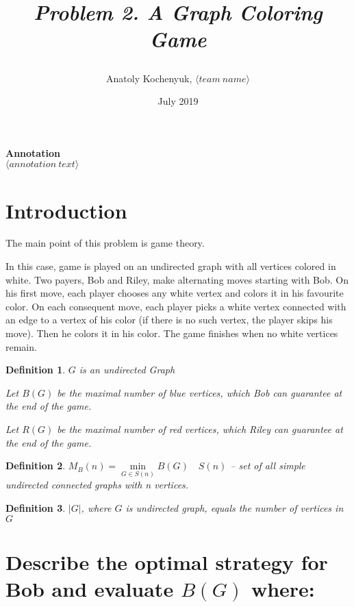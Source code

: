 \documentclass[12pt,a4paper, flushleft]{article}
\author{Anatoly Kochenyuk, $\langle team~name\rangle$}
\date{July 2019}
\title{
	\vspace{4cm}	
	\horline{440}	
	\begin{center}
		\begin{Huge}
			\textbf{\emph{Problem 2. A Graph Coloring Game}}
		\end{Huge}
	\end{center}	
	\vspace{-1.3cm}	
	\horline{460}
}
\newtheorem{Def}{Definition}[section]
\newcommand{\lr}[1]{\langle #1 \rangle}
\begin{document}
\maketitle
\vspace{4cm}
	
	\begin{myquote}
	\begin{center}
		\textbf{Annotation}\\
		\textit{
			$\lr{annotation~text}$
		}
	\end{center}
	\end{myquote}	
	
	\pagebreak

	\tableofcontents	
	
	\pagebreak
	
\section*{Introduction}
The main point of this problem is game theory.

In this case, game is played on an undirected graph with all vertices colored in white. Two payers, Bob and Riley, make alternating moves starting with Bob. On his first move, each player chooses
any white vertex and colors it in his favourite color. On each consequent move, each player picks
a white vertex connected with an edge to a vertex of his color (if there is no such vertex, the
player skips his move). Then he colors it in his color. The game finishes when no white vertices
remain.

\begin{Def}
	$G$ is an undirected Graph

	Let $B(G)$ be the maximal number of blue vertices, which Bob can guarantee at the end of
the game.

	Let $R(G)$ be the maximal number of red vertices, which Riley can guarantee at the
end of the game.
\end{Def}

\begin{Def}
	$M_B(n) = \min\limits_{G\in S(n)}B(G)\quad S(n)$ -- set of all simple undirected connected graphs with n vertices.
\end{Def}

\begin{Def}
	$|G|$, where $G$ is undirected graph, equals the number of vertices in $G$
\end{Def}

\section{Describe the optimal strategy for Bob and evaluate $B(G)$ where:}
\end{document}
